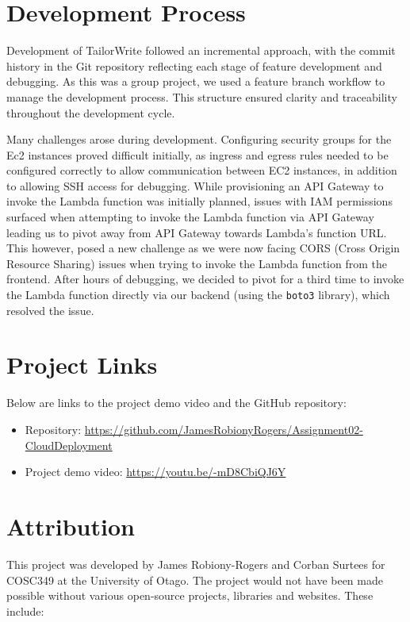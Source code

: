 \documentclass[a4paper, 11pt]{article}
\newcommand{\projectRepoURL}{https://github.com/JamesRobionyRogers/Assignment02-CloudDeployment}
\newcommand{\projectDemoVideoURL}{https://youtu.be/-mD8CbiQJ6Y}
\newcommand{\estimatedCostInUseURL}{https://calculator.aws/\#/estimate?id=33078729fb24a4066ea8e14f12bfd1392267dc69}
\begin{document}

\section{Development Process}

Development of TailorWrite followed an incremental approach, with the commit history in the Git repository reflecting each stage of feature development and debugging. As this was a group project, we used a feature branch workflow to manage the development process. This structure ensured clarity and traceability throughout the development cycle.

Many challenges arose during development. Configuring security groups for the Ec2 instances proved difficult initially, as ingress and egress rules needed to be configured correctly to allow communication between EC2 instances, in addition to allowing SSH access for debugging. While provisioning an API Gateway to invoke the Lambda function was initially planned, issues with IAM permissions surfaced when attempting to invoke the Lambda function via API Gateway leading us to pivot away from API Gateway towards Lambda's function URL. This however, posed a new challenge as we were now facing CORS (Cross Origin Resource Sharing) issues when trying to invoke the Lambda function from the frontend. After hours of debugging, we decided to pivot for a third time to invoke the Lambda function directly via our backend (using the \texttt{boto3} library), which resolved the issue.

\section{Project Links}
Below are links to the project demo video and the GitHub repository:

\begin{itemize}
    \item Repository: \url{\projectRepoURL}
    \item Project demo video: \url{\projectDemoVideoURL}
\end{itemize}

\section{Attribution}
This project was developed by James Robiony-Rogers and Corban Surtees for COSC349 at the University of Otago. The project would not have been made possible without various open-source projects, libraries and websites. These include: 
\end{document}
